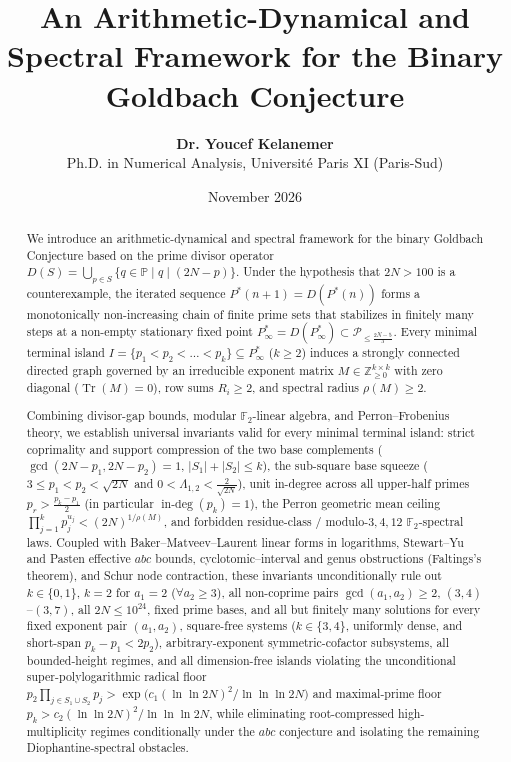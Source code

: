 \documentclass[11pt,a4paper]{article}
\title{\textbf{An Arithmetic-Dynamical and Spectral Framework for the Binary Goldbach Conjecture}}
\author{\textbf{Dr. Youcef Kelanemer}\\[3pt]
\small Ph.D. in Numerical Analysis, Universit\'e Paris XI (Paris-Sud)}
\date{November 2026}
\theoremstyle{definition}
\begin{document}
\maketitle

\begin{abstract}
We introduce an arithmetic-dynamical and spectral framework for the binary Goldbach Conjecture based on the prime divisor operator $D(S) = \bigcup_{p \in S} \{ q \in \mathbb{P} \mid q \mid (2N - p) \}$. Under the hypothesis that $2N > 100$ is a counterexample, the iterated sequence $P^*(n+1) = D(P^*(n))$ forms a monotonically non-increasing chain of finite prime sets that stabilizes in finitely many steps at a non-empty stationary fixed point $P^*_\infty = D(P^*_\infty) \subset \mathcal{P}_{\le \frac{2N-5}{3}}$. Every minimal terminal island $I = \{p_1 < p_2 < \dots < p_k\} \subseteq P^*_\infty$ ($k \ge 2$) induces a strongly connected directed graph governed by an irreducible exponent matrix $M \in \mathbb{Z}_{\ge 0}^{k \times k}$ with zero diagonal ($\operatorname{Tr}(M) = 0$), row sums $R_i \ge 2$, and spectral radius $\rho(M) \ge 2$.

Combining divisor-gap bounds, modular $\mathbb{F}_2$-linear algebra, and Perron--Frobenius theory, we establish universal invariants valid for every minimal terminal island: strict coprimality and support compression of the two base complements ($\gcd(2N - p_1, 2N - p_2) = 1$, $|S_1| + |S_2| \le k$), the sub-square base squeeze ($3 \le p_1 < p_2 < \sqrt{2N}$ and $0 < \Lambda_{1,2} < \frac{2}{\sqrt{2N}}$), unit in-degree across all upper-half primes $p_r > \frac{p_k - p_1}{2}$ (in particular $\operatorname{in-deg}(p_k) = 1$), the Perron geometric mean ceiling $\prod_{j=1}^k p_j^{u_j} < (2N)^{1/\rho(M)}$, and forbidden residue-class / modulo-$3, 4, 12$ $\mathbb{F}_2$-spectral laws. Coupled with Baker--Matveev--Laurent linear forms in logarithms, Stewart--Yu and Pasten effective $abc$ bounds, cyclotomic--interval and genus obstructions (Faltings's theorem), and Schur node contraction, these invariants unconditionally rule out $k \in \{0, 1\}$, $k = 2$ for $a_1 = 2$ ($\forall a_2 \ge 3$), all non-coprime pairs $\gcd(a_1, a_2) \ge 2$, $(3,4)$--$(3,7)$, all $2N \le 10^{24}$, fixed prime bases, and all but finitely many solutions for every fixed exponent pair $(a_1, a_2)$, square-free systems ($k \in \{3, 4\}$, uniformly dense, and short-span $p_k - p_1 < 2p_2$), arbitrary-exponent symmetric-cofactor subsystems, all bounded-height regimes, and all dimension-free islands violating the unconditional super-polylogarithmic radical floor $p_2 \prod_{j \in S_1 \cup S_2} p_j > \exp\bigl(c_1 (\ln\ln 2N)^2 / \ln\ln\ln 2N\bigr)$ and maximal-prime floor $p_k > c_2 (\ln\ln 2N)^2 / \ln\ln\ln 2N$, while eliminating root-compressed high-multiplicity regimes conditionally under the $abc$ conjecture and isolating the remaining Diophantine-spectral obstacles.
\end{abstract}
\end{document}
